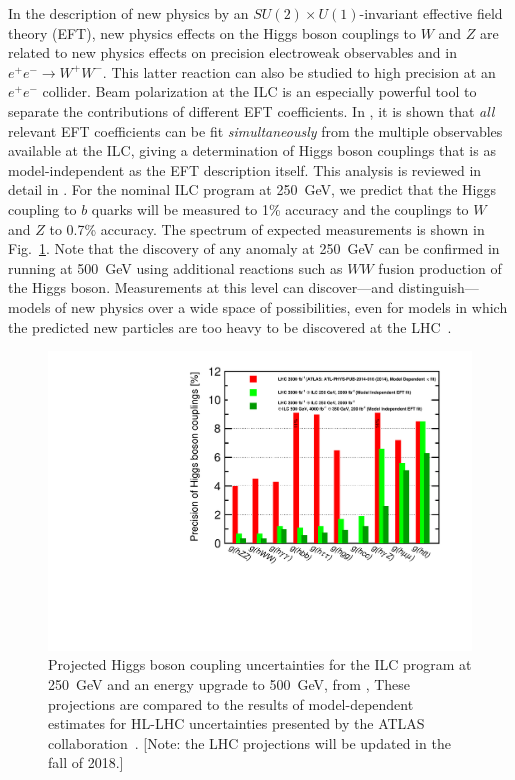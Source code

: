 \documentclass[%
 reprint,
 amsmath,amssymb,
 aps,
]{revtex4-1}
\def\ee{e^+e^-}
\begin{document}
In the description of new physics by an  $SU(2)\times U(1)$-invariant
effective field theory (EFT), new physics effects on the  Higgs boson
couplings to $W$ and $Z$ are related to new physics effects on
precision electroweak observables and in $\ee\to W^+W^-$.   This
latter reaction can also be studied to high precision at an $\ee$
collider.  Beam polarization at the ILC is an especially powerful tool
to separate the contributions of different EFT
coefficients.    In \cite{Barklow:2017suo}, it is shown that {\it all}
relevant EFT
coefficients can be fit {\it simultaneously} from the multiple
observables available at the ILC, giving a 
determination of Higgs boson couplings that is as
model-independent as the EFT description itself. 
 This analysis is reviewed in detail in
\cite{ILCforESS}. 
For the nominal ILC program at 250~GeV, we predict that the Higgs
coupling to $b$ quarks will be measured to 1\% accuracy and the
couplings to $W$ and $Z$ to 0.7\% accuracy.  The spectrum of  expected
measurements is shown in Fig.~\ref{fig:Higgssummary}.  Note that the 
discovery of any anomaly at 250~GeV can be confirmed in running at
500~GeV 
using additional reactions  such as $WW$ fusion production of the
Higgs boson.   Measurements at this
level can discover---and distinguish---models of new physics over a
wide space of possibilities, even for models in which the predicted new
particles are too heavy to be discovered at the LHC~\cite{Barklow:2017suo}.

\begin{figure}
\begin{center}
\includegraphics[width=0.95\hsize]{figures/DeltaH_EFT.pdf}
\end{center}
\caption{Projected Higgs boson coupling uncertainties for the ILC
  program at 250~GeV and an energy upgrade to 500~GeV, from \cite{Fujii:2017vwa}, 
 These projections are compared to
  the results of model-dependent estimates for HL-LHC uncertainties 
presented by the ATLAS 
collaboration~\cite{H2aaLHC}. [Note: the LHC projections will be
updated in the fall of 2018.]}
\label{fig:Higgssummary}
\end{figure}
\end{document}
